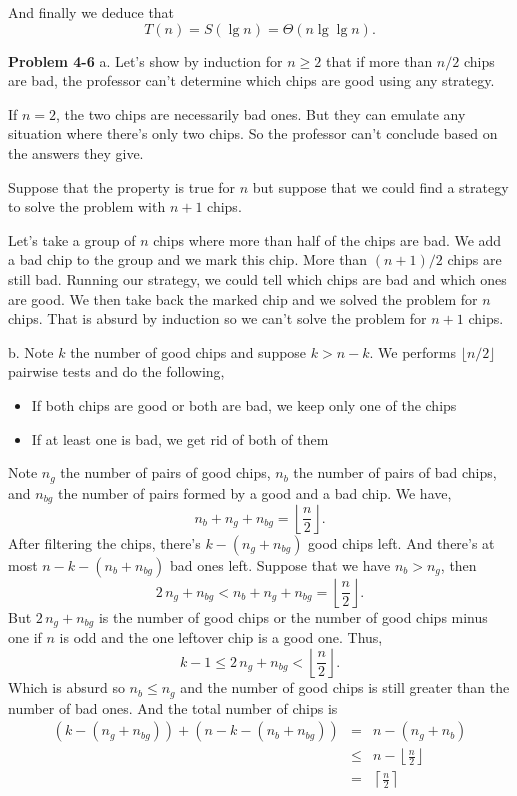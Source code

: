 \documentclass[a4paper,12pt]{article}
\newcommand{\newprob}[1]
{\bigskip \noindent \textbf{Problem #1} \newline}
\newcommand{\subpar}[1]{\medskip \noindent #1.}
\begin{document}
And finally we deduce that
\[ T(n) = S(\lg n) = \Theta(n \lg \lg n).\]

\newprob{4-6}
\subpar{a}  Let's show by induction for $n \ge 2$ that if more than
$n/2$ chips are bad, the professor can't determine which chips are
good using any strategy.

If $n=2$, the two chips are necessarily bad ones.  But they can
emulate any situation where there's only two chips.  So the professor
can't conclude based on the answers they give.

Suppose that the property is true for $n$ but suppose that we could
find a strategy to solve the problem with $n+1$ chips.

Let's take a group of $n$ chips where more than half of the chips are
bad.  We add a bad chip to the group and we mark this chip. More than
$(n+1)/2$ chips are still bad.  Running our strategy, we could tell
which chips are bad and which ones are good.  We then take back the
marked chip and we solved the problem for $n$ chips.  That is absurd
by induction so we can't solve the problem for $n+1$ chips.

\subpar{b} Note $k$ the number of good chips and suppose $k > n-k$.  We
performs $\lfloor n/2\rfloor$ pairwise tests and do the following,
\begin{itemize}
\item
  If both chips are good or both are bad, we keep only one of the
  chips
\item
  If at least one is bad, we get rid of both of them
\end{itemize}
Note $n_g$ the number of pairs of good chips, $n_b$ the number of
pairs of bad chips, and $n_{bg}$ the number of pairs formed by a
good and a bad chip.  We have,
\[ n_b + n_g + n_{bg} = \left\lfloor\frac{n}{2}\right\rfloor.\]
After filtering the chips, there's $k - (n_g + n_{bg})$ good chips
left.  And there's at most $n-k - (n_b + n_{bg})$ bad ones left.
Suppose that we have $n_b > n_g$, then
\[ 2\,n_g + n_{bg} < n_b + n_g + n_{bg} =
\left\lfloor\frac{n}{2}\right\rfloor.\]
But $2\,n_g + n_{bg}$ is the number of good chips or the number of
good chips minus one if $n$ is odd and the one leftover chip is a good
one.  Thus,
\[ k-1 \le 2\,n_g + n_{bg} < \left\lfloor\frac{n}{2}\right\rfloor.\]
Which is absurd so $n_b \le n_g$ and the number of good chips is still
greater than the number of bad ones.  And the total number of chips is
\begin{eqnarray*}
  (k - (n_g + n_{bg})) + (n-k - (n_b + n_{bg})) &=& n - (n_g + n_b) \\
  &\le& n - \left\lfloor \frac{n}{2}\right\rfloor \\
  &=& \left\lceil \frac{n}{2}\right\rceil
\end{eqnarray*}
\end{document}
